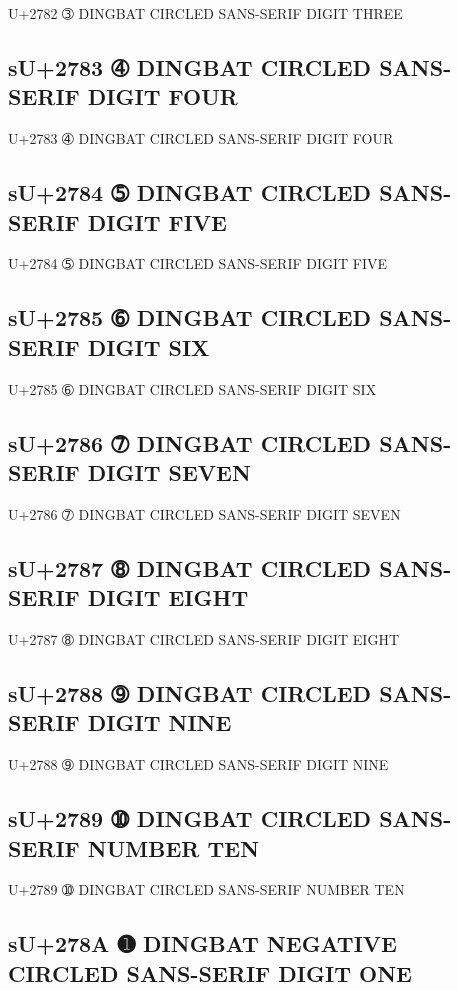 U+2782 ➂ DINGBAT CIRCLED SANS-SERIF DIGIT THREE

\subsection{sU+2783 ➃ DINGBAT CIRCLED SANS-SERIF DIGIT FOUR}

U+2783 ➃ DINGBAT CIRCLED SANS-SERIF DIGIT FOUR

\subsection{sU+2784 ➄ DINGBAT CIRCLED SANS-SERIF DIGIT FIVE}

U+2784 ➄ DINGBAT CIRCLED SANS-SERIF DIGIT FIVE

\subsection{sU+2785 ➅ DINGBAT CIRCLED SANS-SERIF DIGIT SIX}

U+2785 ➅ DINGBAT CIRCLED SANS-SERIF DIGIT SIX

\subsection{sU+2786 ➆ DINGBAT CIRCLED SANS-SERIF DIGIT SEVEN}

U+2786 ➆ DINGBAT CIRCLED SANS-SERIF DIGIT SEVEN

\subsection{sU+2787 ➇ DINGBAT CIRCLED SANS-SERIF DIGIT EIGHT}

U+2787 ➇ DINGBAT CIRCLED SANS-SERIF DIGIT EIGHT

\subsection{sU+2788 ➈ DINGBAT CIRCLED SANS-SERIF DIGIT NINE}

U+2788 ➈ DINGBAT CIRCLED SANS-SERIF DIGIT NINE

\subsection{sU+2789 ➉ DINGBAT CIRCLED SANS-SERIF NUMBER TEN}

U+2789 ➉ DINGBAT CIRCLED SANS-SERIF NUMBER TEN

\subsection{sU+278A ➊ DINGBAT NEGATIVE CIRCLED SANS-SERIF DIGIT ONE}

